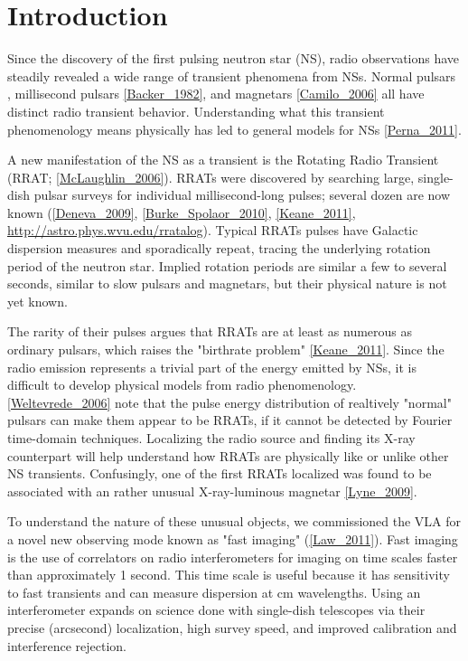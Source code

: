 \section{Introduction}

Since the discovery of the first pulsing neutron star (NS), radio observations have steadily revealed a wide range of transient phenomena from NSs. Normal pulsars \citep{HEWISH_1969}, millisecond pulsars \ref{Backer_1982}, and magnetars \ref{Camilo_2006} all have distinct radio transient behavior. Understanding what this transient phenomenology means physically has led to general models for NSs \ref{Perna_2011}.

A new manifestation of the NS as a transient is the Rotating Radio Transient (RRAT; \ref{McLaughlin_2006}). RRATs were discovered by searching large, single-dish pulsar surveys for individual millisecond-long pulses; several dozen are now known (\ref{Deneva_2009}, \ref{Burke_Spolaor_2010}, \ref{Keane_2011}, \url{http://astro.phys.wvu.edu/rratalog}). Typical RRATs pulses have Galactic dispersion measures and sporadically repeat, tracing the underlying rotation period of the neutron star. Implied rotation periods are similar a few to several seconds, similar to slow pulsars and magnetars, but their physical nature is not yet known. 

The rarity of their pulses argues that RRATs are at least as numerous as ordinary pulsars, which raises the "birthrate problem" \ref{Keane_2011}. Since the radio emission represents a trivial part of the energy emitted by NSs, it is difficult to develop physical models from radio phenomenology. \ref{Weltevrede_2006} note that the pulse energy distribution of realtively "normal" pulsars can make them appear to be RRATs, if it cannot be detected by Fourier time-domain techniques. Localizing the radio source and finding its X-ray counterpart will help understand how RRATs are physically like or unlike other NS transients. Confusingly, one of the first RRATs localized was found to be associated with an rather unusual X-ray-luminous magnetar \ref{Lyne_2009}.

To understand the nature of these unusual objects, we commissioned the VLA for a novel new observing mode known as "fast imaging" (\ref{Law_2011}). Fast imaging is the use of correlators on radio interferometers for imaging on time scales faster than approximately 1 second. This time scale is useful because it has sensitivity to fast transients and can measure dispersion at cm wavelengths. Using an interferometer expands on science done with single-dish telescopes via their precise (arcsecond) localization, high survey speed, and improved calibration and interference rejection.

